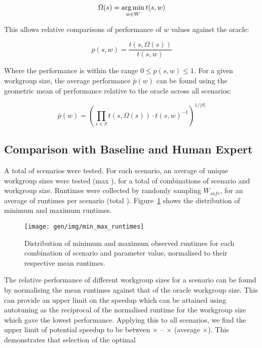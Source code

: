 \begin{equation}
\Omega(s) = \operatorname*{arg\,min}_{w \in W} t(s,w)
\end{equation}

This allows relative comparisons of performance of $w$ values against
the oracle:

\begin{equation}
p(s,w) = \frac{t(s,\Omega(s))}{t(s,w)}
\end{equation}

Where the performance is within the range $0 \le p(s,w) \le 1$. For a
given workgroup size, the average performance $\bar{p}(w)$ can be
found using the geometric mean of performance relative to the oracle
across all scenarios:

\begin{equation}
\bar{p}(w) =
\left(
  \prod_{s \in S} t(s,\Omega(s)) \cdot t(s,w)^{-1}
\right)^{1/|S|}
\end{equation}



\subsection{Comparison with Baseline and Human Expert}

A total of  scenarios were tested. For each
scenario, an average of  unique workgroup
sizes were tested (max ), for a total of
 combinations of scenario and workgroup
size. Runtimes were collected by randomly sampling $W_{safe}$, for an
average of  runtimes per scenario (total
). Figure~\ref{fig:min-max-runtimes} shows the
distribution of minimum and maximum runtimes.

\begin{figure}
\centering
\texttt{[image: gen/img/min\_max\_runtimes]}
\caption{%
  Distribution of minimum and maximum observed runtimes for each
  combination of scenario and parameter value, normalised to their
  respective mean runtimes.%
}
\label{fig:min-max-runtimes}
\end{figure}

The relative performance of different workgroup sizes for a scenario
can be found by normalising the mean runtimes against that of the
oracle workgroup size. This can provide an upper limit on the speedup
which can be attained using autotuning as the reciprocal of the
normalised runtime for the workgroup size which gave the lowest
performance. Applying this to all scenarios, we find the upper limit
of potential speedup to be between
$\times$ --
$\times$ (average
$\times$). This demonstrates that
selection of the optimal

